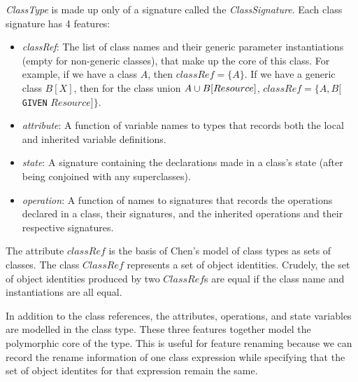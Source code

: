 \vspace{2mm} {\em ClassType} is made up only of a signature called
the {\em ClassSignature}. Each class signature has 4 features:
\begin{itemize}
  \item {\em classRef}: The list of class names and their generic
    parameter instantiations (empty for non-generic classes), that
    make up the core of this class. For example, if we have a class
    $A$, then $classRef = \{ A \}$. If we have a generic class $B[X]$,
    then for the class union $A \classuni B[Resource]$,
    $classRef = \{ A, B[${\tt GIVEN} $Resource]\}$.
  \item {\em attribute}: A function of variable names to types that records
    both the local and inherited variable definitions.
  \item {\em state}: A signature containing the declarations made in a
    class's state (after being conjoined with any superclasses).
  \item {\em operation}: A function of names to signatures that
    records the operations declared in a class, their signatures, and
    the inherited operations and their respective signatures.
\end{itemize}

The attribute $classRef$ is the basis of Chen's model of class types
as sets of classes. The class $ClassRef$ represents a set of object
identities. Crudely, the set of object identities produced by two
$ClassRef$s are equal if the class name and
instantiations are all equal.

In addition to the class references, the attributes, operations, and
state variables are modelled in the class type. These three features
together model the polymorphic core of the type. This is useful for
feature renaming because we can record the rename information of one
class expression while specifying that the set of object identites
for that expression remain the same.

